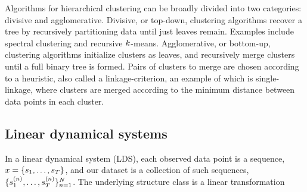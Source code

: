 Algorithms for hierarchical clustering can be broadly
divided into two categories: divisive and agglomerative.
Divisive, or top-down, clustering algorithms recover a tree by recursively
partitioning data until just leaves remain. Examples
include spectral clustering \citep{} and recursive $k$-means.
Agglomerative, or bottom-up, clustering algorithms
initialize clusters as leaves, and recursively
merge clusters until a full binary tree is formed.
Pairs of clusters to merge are chosen according to
a heuristic, also called a linkage-criterion,
an example of which is single-linkage,
where clusters are merged according to the minimum
distance between data points in each cluster.

\subsection{Linear dynamical systems}
In a linear dynamical system (LDS), 
each observed data point is a sequence, 
$x = \{s_1, \ldots, s_{T}\}$, and our dataset
is a collection of such sequences, $\{s_1^{(n)}, \ldots, s_{T}^{(n)}\}_{n = 1}^{N}$.
The underlying structure class is
a linear transformation